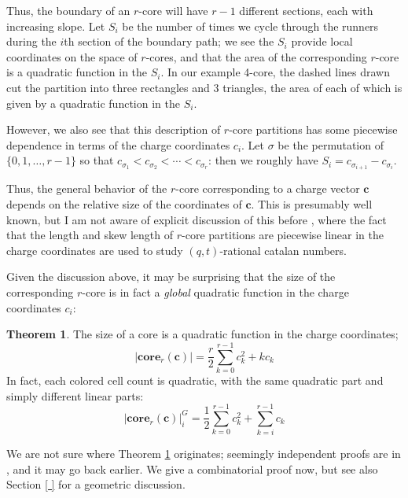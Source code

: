\documentclass{amsart}[12pt]
\theoremstyle{definition}
\newtheorem{theorem}[dummy]{Theorem}
\newcommand{\core}{\mathbf{core}}
\begin{document}
Thus, the boundary of an $r$-core will have $r-1$ different sections, each with increasing slope.  Let $S_i$ be the number of times we cycle through the runners during the $i$th section of the boundary path; we see the $S_i$ provide local coordinates on the space of $r$-cores, and that the area of the corresponding $r$-core is a quadratic function in the $S_i$.  In our example 4-core, the dashed lines drawn cut the partition into three rectangles and 3 triangles, the area of each of which is given by a quadratic function in the $S_i$.


However, we also see that this description of $r$-core partitions has some piecewise dependence in terms of the charge coordinates $c_i$.  Let $\sigma$ be the permutation of $\{0,1,\dots,r-1\}$ so that $c_{\sigma_1}<c_{\sigma_2}<\cdots < c_{\sigma_r}$: then we roughly have $S_i=c_{\sigma_{i+1}}-c_{\sigma_i}$.

Thus, the general behavior of the $r$-core corresponding to a charge vector $\mathbf{c}$ depends on the relative size of the coordinates of $\mathbf{c}$.  This is presumably well known, but I am not aware of explicit discussion of this before \cite{jsimultaneous}, where the fact that the length and skew length of $r$-core partitions are piecewise linear in the charge coordinates are used to study $(q,t)$-rational catalan numbers.





Given the discussion above, it may be surprising that the size of the corresponding $r$-core is in fact a \emph{global} quadratic function in the charge coordinates $c_i$:




\begin{theorem} \label{thm:quadratic-sl2}
The size of a core is a quadratic function in the charge coordinates;
$$|\core_r(\mathbf{c})|=\frac{r}{2}\sum_{k=0}^{r-1} c_k^2+ kc_k$$
In fact, each colored cell count is quadratic, with the same quadratic part and simply different linear parts:  
$$|\core_r(\mathbf{c})|^G_i=\frac{1}{2}\sum_{k=0}^{r-1} c_k^2+ \sum^{r-1}_{k=i}c_k$$
\end{theorem}

We are not sure where Theorem \ref{thm:quadratic-sl2} originates; seemingly independent proofs are in \cite{GKS, DS}, and it may go back earlier.  We give a combinatorial proof now, but see also Section \ref{ } for a geometric discussion.
\end{document}
